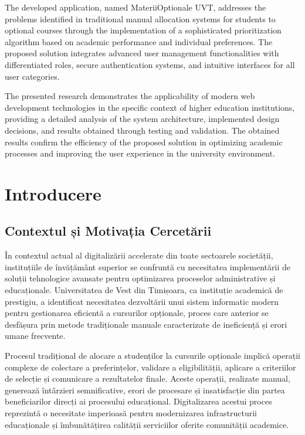 \documentclass[12pt,a4paper]{report}
\begin{document}
The developed application, named MateriiOptionale UVT, addresses the problems identified in traditional manual allocation systems for students to optional courses through the implementation of a sophisticated prioritization algorithm based on academic performance and individual preferences. The proposed solution integrates advanced user management functionalities with differentiated roles, secure authentication systems, and intuitive interfaces for all user categories.

The presented research demonstrates the applicability of modern web development technologies in the specific context of higher education institutions, providing a detailed analysis of the system architecture, implemented design decisions, and results obtained through testing and validation. The obtained results confirm the efficiency of the proposed solution in optimizing academic processes and improving the user experience in the university environment.

\vspace*{\fill}

\newpage
\tableofcontents
\newpage
\listoftables
\newpage
\listoffigures
\newpage

\chapter{Introducere}

\section{Contextul și Motivația Cercetării}

În contextul actual al digitalizării accelerate din toate sectoarele societății, instituțiile de învățământ superior se confruntă cu necesitatea implementării de soluții tehnologice avansate pentru optimizarea proceselor administrative și educaționale. Universitatea de Vest din Timișoara, ca instituție academică de prestigiu, a identificat necesitatea dezvoltării unui sistem informatic modern pentru gestionarea eficientă a cursurilor opționale, proces care anterior se desfășura prin metode tradiționale manuale caracterizate de ineficiență și erori umane frecvente.

Procesul tradițional de alocare a studenților la cursurile opționale implică operații complexe de colectare a preferințelor, validare a eligibilității, aplicare a criteriilor de selecție și comunicare a rezultatelor finale. Aceste operații, realizate manual, generează întârzieri semnificative, erori de procesare și insatisfacție din partea beneficiarilor direcți ai procesului educațional. Digitalizarea acestui proces reprezintă o necesitate imperioasă pentru modernizarea infrastructurii educaționale și îmbunătățirea calității serviciilor oferite comunității academice.
\end{document}
